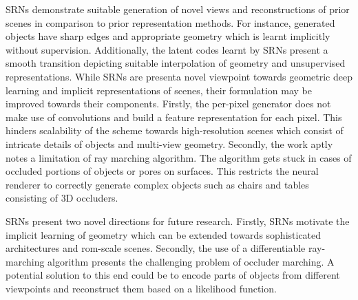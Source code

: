 \documentclass[11pt,letterpaper]{article}
\begin{document}
SRNs demonstrate suitable generation of novel views and reconstructions of prior scenes in comparison to prior representation methods. For instance, generated objects have sharp edges and appropriate geometry which is learnt implicitly without supervision. Additionally, the latent codes learnt by SRNs present a smooth transition depicting suitable interpolation of geometry and unsupervised representations. While SRNs are presenta novel viewpoint towards geometric deep learning and implicit representations of scenes, their formulation may be improved towards their components. Firstly, the per-pixel generator does not make use of convolutions and build a feature representation for each pixel. This hinders scalability of the scheme towards high-resolution scenes which consist of intricate details of objects and multi-view geometry. Secondly, the work aptly notes a limitation of ray marching algorithm. The algorithm gets stuck in cases of occluded portions of objects or pores on surfaces. This restricts the neural renderer to correctly generate complex objects such as chairs and tables consisting of 3D occluders. 

SRNs present two novel directions for future research. Firstly, SRNs motivate the implicit learning of geometry which can be extended towards sophisticated architectures and rom-scale scenes. Secondly, the use of a differentiable ray-marching algorithm presents the challenging problem of occluder marching. A potential solution to this end could be to encode parts of objects from different viewpoints and reconstruct them based on a likelihood function. 
\end{document}
